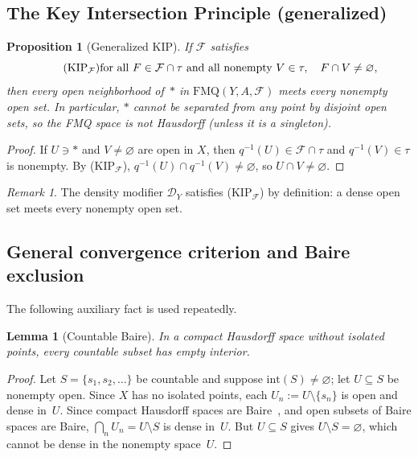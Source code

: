 \documentclass[11pt]{article}
\newtheorem{lemma}[theorem]{Lemma}
\newtheorem{proposition}[theorem]{Proposition}
\theoremstyle{definition}
\theoremstyle{remark}
\newtheorem{remark}[theorem]{Remark}
\begin{document}
\subsection{The Key Intersection Principle (generalized)}

\begin{proposition}[Generalized KIP]\label{prop:gen-KIP}
If $\mathcal{F}$ satisfies
\begin{equation}\tag{KIP$_{\mathcal{F}}$}
\text{for all } F \in \mathcal{F} \cap \tau \text{ and all nonempty } V \in \tau, \quad
F \cap V \neq \varnothing,
\end{equation}
then every open neighborhood of~$\ast$ in $\mathrm{FMQ}(Y, A, \mathcal{F})$
meets every nonempty open set.
In particular, $\ast$ cannot be separated from any point by disjoint open sets,
so the FMQ space is not Hausdorff (unless it is a singleton).
\end{proposition}

\begin{proof}
If $U \ni \ast$ and $V \neq \varnothing$ are open in $X$, then
$q^{-1}(U) \in \mathcal{F} \cap \tau$ and $q^{-1}(V) \in \tau$ is nonempty. By
(KIP$_{\mathcal{F}}$), $q^{-1}(U) \cap q^{-1}(V) \neq \varnothing$, so
$U \cap V \neq \varnothing$.
\end{proof}

\begin{remark}\label{rem:KIPdensity}
The density modifier $\mathcal{D}_Y$ satisfies
\textup{(KIP$_{\mathcal{F}}$)} by definition: a dense
open set meets every nonempty open set.
\end{remark}

\subsection{General convergence criterion and Baire exclusion}

The following auxiliary fact is used repeatedly.

\begin{lemma}[Countable Baire]\label{lem:countable-baire}
In a compact Hausdorff space without isolated points, every countable
subset has empty interior.
\end{lemma}

\begin{proof}
Let $S = \{s_1, s_2, \ldots\}$ be countable and suppose
$\mathrm{int}(S) \neq \varnothing$; let $U \subseteq S$ be nonempty
open.  Since $X$ has no isolated points, each $U_n := U \setminus \{s_n\}$ is
open and dense in~$U$.  Since compact Hausdorff spaces are
Baire~\cite{bib:munkres}, and open subsets of Baire spaces are Baire,
$\bigcap_n U_n = U \setminus S$ is dense in~$U$.  But
$U \subseteq S$ gives $U \setminus S = \varnothing$, which cannot be
dense in the nonempty space~$U$.
\end{proof}
\end{document}
